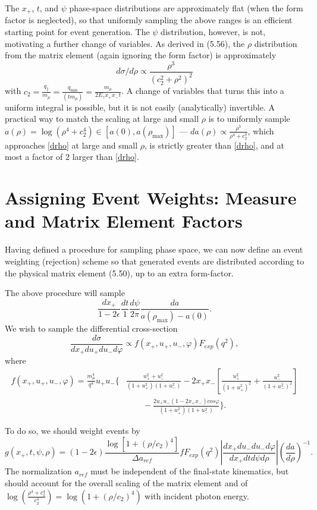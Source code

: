 \documentclass[11pt]{article}
\newcommand{\be}{\begin{equation}}
\newcommand{\ee}{\end{equation}}
\newcommand{\bea}{\begin{eqnarray}}
\newcommand{\eea}{\end{eqnarray}}
\newcommand{\pal}{\parallel}
\begin{document}
The $x_+$, $t$, and $\psi$ phase-space distributions are approximately flat (when the form factor is neglected), so that uniformly sampling the above ranges is an efficient starting point for event generation.  The $\psi$ distribution, however, is not, motivating a further change of variables.  As derived in (5.56), the $\rho$ distribution from the matrix element (again ignoring the form factor) is approximately 
\be
d\sigma/d\rho \propto \frac{\rho^3}{(c_2^2 + \rho^2)^2} \label{drho}
\ee
with $c_2 =\frac {q_\pal} {m_\mu} =  \frac{q_{\min}}{(t m_\mu)} = \frac{m_\mu }{2 E_\gamma x_+ x_- t}$.  
A change of variables that turns this into a uniform integral is possible, but it is not easily (analytically) invertible.  A practical way to match the scaling at large and small $\rho$ is to uniformly sample $a(\rho) = \log(\rho^4+c_2^4) \in [a(0),a(\rho_{\max})]$ --- $da(\rho) \propto \frac{\rho^3}{\rho^4 + c_2^4}$, which approaches  \eqref{drho} at large and small $\rho$, is strictly greater than \eqref{drho}, and at most a factor of 2 larger than \eqref{drho}.  


\section{Assigning Event Weights: Measure and Matrix Element Factors}
Having defined a procedure for sampling phase space, we can now define an event weighting (rejection) scheme so that generated events are distributed according to the physical matrix element (5.50), up to an extra form-factor.  

The above procedure will sample
\be
\frac{dx_+}{1-2\epsilon} \frac{dt}{1} \frac{d\psi}{2\pi} \frac{da}{a(\rho_{\max})-a(0)}. 
\ee
We wish to sample the differential cross-section 
\be
\frac{d\sigma}{dx_+ du_+ du_- d\varphi} \propto f(x_+, u_+, u_-, \varphi) F_{exp}(q^2),
\ee
where 
\bea
f(x_+, u_+, u_-, \varphi) = \frac{m_\mu^4}{q^4} u_+ u_- \bigg\{& \frac{ u_+^2 + u_-^2}{(1+u_+^2) (1+u_-^2)} -2 x_+ x_- \left[\frac{u_+^2 }{(1+u_+^2)^2} + \frac{u_-^2 }{(1+u_-^2)^2}\right]\nonumber\\
& \qquad -\frac{2 u_+ u_- (1-2 x_+ x_-) cos\varphi}{(1+u_+^2) (1+u_-^2)} \bigg\}.
\eea


To do so, we should weight events by 
\be
g(x_+, t,\psi, \rho) = (1-2\epsilon) \frac{\log\left[1 + (\rho/c_2)^4\right]}{\Delta a_{ref}} f F_{exp}(q^2) \left| \frac{d x_+ du_- du_- d\varphi}{d x_+ d t d\psi d\rho}\right| \left(\frac{da}{d\rho}\right)^{-1}. 
\ee
The normalization $a_{ref}$ must be independent of the final-state kinematics, but should account for the overall scaling of the matrix element and of $\log\left( \frac{\rho^4 +c_2^4}{c_2^4}\right) = \log(1+(\rho/c_2)^4)$ with incident photon energy.
\end{document}
